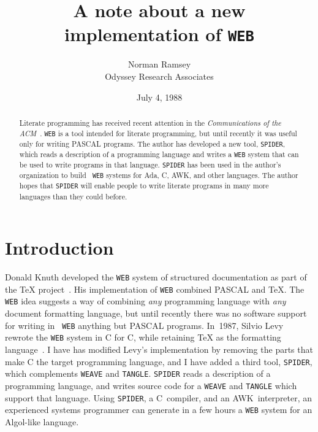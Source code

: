 
\title{A note about a new implementation of {\tt WEB}}
\author{Norman Ramsey\\Odyssey Research Associates}
\date{July 4, 1988}
\setcounter{secnumdepth}{0}

\maketitle

\begin{abstract}
Literate programming has received recent attention in the {\sl
Communications of the ACM}~\cite{bentley:lp,cvw:loom}. 
{\tt WEB} is a tool intended for literate programming, but 
until recently it was  useful only for writing PASCAL programs.
The author has developed a new tool, {\tt SPIDER}, which reads a
description of a programming language and writes a {\tt WEB} system
that can be used to write programs in that language.
{\tt SPIDER} has been used in the author's organization to build {\tt
WEB} systems for Ada, C, AWK, and other languages.
The author hopes that {\tt SPIDER} will enable people to write
literate programs in many more languages than they could before.
\end{abstract}


\section{Introduction}
Donald Knuth developed the {\tt WEB} system of structured documentation 
as part of the {\TeX} project~\cite{knuth:literate-programming}.
His implementation of {\tt WEB} combined PASCAL and {\TeX}.
  The {\tt WEB} idea suggests a way of combining {\em any}
programming language with {\em any} document formatting language,
but until recently there was no software support for writing in {\tt
WEB} anything but PASCAL programs.
In~1987, Silvio Levy rewrote the {\tt WEB} system in C for C,
while retaining {\TeX} as the formatting language~\cite{levy:cweb}.
I have has modified Levy's implementation by removing the parts
that  make C the target programming language, and I have
 added a third tool, {\tt SPIDER}, which complements {\tt WEAVE}
and {\tt TANGLE}.
{\tt SPIDER} reads a description of a programming language, and writes
source code for a {\tt WEAVE} and {\tt TANGLE} which support that
language. 
Using {\tt SPIDER}, a C~compiler, and an AWK~interpreter, an experienced
systems programmer can generate in a few hours a {\tt WEB} system for
an Algol-like language.

